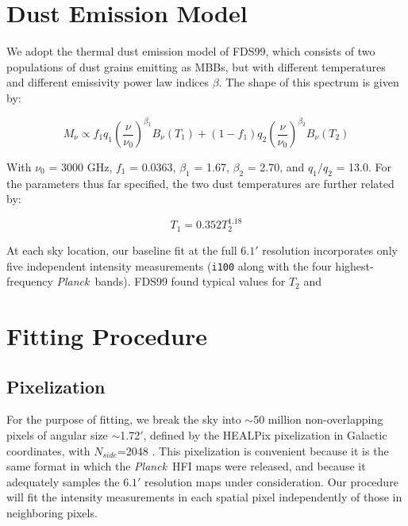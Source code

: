 \documentclass{emulateapj}
\newcommand{\PLANCK}{{\it Planck}}
\begin{document}
\section{Dust Emission Model}
\label{sec:modeling}

We adopt the thermal dust emission model of FDS99, which consists of two 
populations of dust grains emitting as MBBs, but with different temperatures 
and different emissivity power law indices $\beta$. The shape of this spectrum 
is given by:

\begin{equation}
M_{\nu} \propto f_{1}q_{1}(\frac{\nu}{\nu_{0}})^{\beta_1}B_{\nu}(T_1) + (1-f_{1})q_{2}(\frac{\nu}{\nu_0})^{\beta_2}B_{\nu}(T_2)
\end{equation}

With $\nu_0$ = 3000 GHz, $f_{1}$ = 0.0363, $\beta_1$ = 1.67, $\beta_2$ = 2.70, 
and $q_1/q_2$ = 13.0. For the parameters thus far specified, the two dust 
temperatures are further related by:

\begin{equation}
T_1 = 0.352T_2^{1.18}
\end{equation}

At each sky location, our baseline fit at the full $6.1'$ resolution 
incorporates only five independent intensity measurements (\verb|i100| along 
with the four highest-frequency \PLANCK~bands). FDS99 found typical values for 
$T_2$ and 


\section{Fitting Procedure}
\label{sec:fitting}


\subsection{Pixelization}
\label{sec:pix}
For the purpose of fitting, we break the sky into $\sim$50 million 
non-overlapping pixels of angular size $\sim$1.72$'$, defined by the HEALPix 
pixelization in Galactic coordinates, with $N_{side}$=2048 \citep{healpix}. 
This pixelization is convenient because it is the same format in which the 
\PLANCK~HFI maps were released, and because it adequately samples the $6.1'$ 
resolution maps under consideration. Our procedure will fit the intensity 
measurements in each spatial pixel independently of those in neighboring 
pixels.
\end{document}
